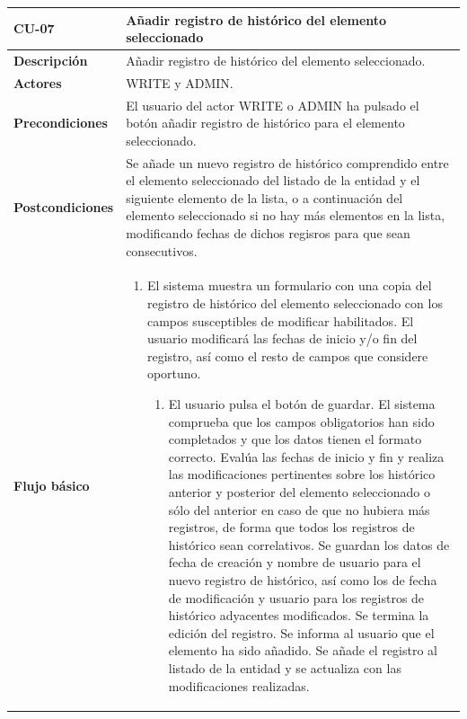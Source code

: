 \begin{table} [H]
    \centering
    \setlength{\leftmargini}{0.4cm}
	\resizebox{14cm}{!} { %
    \begin{tabular}{| m{3cm} | m{11cm} |}   
    \hline
	  \textbf{CU-07} & \textbf{Añadir registro de histórico del elemento seleccionado} \\\hline
	  \textbf{Descripción} & Añadir registro de histórico del elemento seleccionado. \\\hline
	  \textbf{Actores} & WRITE y ADMIN. \\\hline
	  \textbf{Precondiciones} & El usuario del actor WRITE o ADMIN ha pulsado el botón añadir registro de histórico para el elemento seleccionado. \\\hline
	  \textbf{Postcondiciones} & Se añade un nuevo registro de histórico  comprendido entre el elemento seleccionado del listado de la entidad y el siguiente elemento de la lista, o a continuación del elemento seleccionado si no hay más elementos en la lista, modificando fechas de dichos regisros para que sean consecutivos. \\\hline
	  \textbf{Flujo básico} & 
		\begin{enumerate}
	  	\item El sistema muestra un formulario con una copia del registro de histórico del elemento seleccionado con los campos susceptibles de modificar habilitados. El usuario modificará las fechas de inicio y/o fin del registro, así como el resto de campos que considere oportuno. 
			\begin{enumerate}	
			   \item El usuario pulsa el botón de guardar. El sistema comprueba que los campos obligatorios han sido completados y que los datos tienen el formato correcto. Evalúa las fechas de inicio y fin y realiza las modificaciones pertinentes sobre los histórico anterior y posterior del elemento seleccionado o sólo del anterior en caso de que no hubiera más registros, de forma que todos los registros de histórico sean correlativos. Se guardan los datos de fecha de creación y nombre de usuario para el nuevo registro de histórico, así como los de fecha de modificación y usuario para los registros de histórico adyacentes modificados. Se termina la edición del registro. Se informa al usuario que el elemento ha sido añadido. Se añade el registro al listado de la entidad y se actualiza con las modificaciones realizadas.

\end{enumerate}
\end{enumerate}
\end{tabular}}
\end{table}
